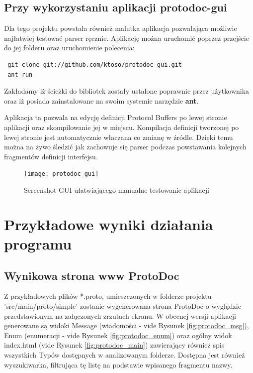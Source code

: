 \documentclass[a4paper]{article}
\begin{document}
\subsection{Przy wykorzystaniu aplikacji protodoc-gui}
Dla tego projektu powstała również malutka aplikacja pozwalająca możliwie najłatwiej testować parser ręcznie.
Aplikację można uruchomić poprzez przejście do jej folderu oraz uruchomienie polecenia: 
\begin{verbatim}
 git clone git://github.com/ktoso/protodoc-gui.git
 ant run
\end{verbatim}
Zakładamy iż ścieżki do bibliotek zostały ustalone poprawnie przez użytkownika oraz iż posiada zainstalowane na swoim systemie narzędzie \textbf{ant}.

Aplikacja ta pozwala na edycję definicji Protocol Buffers po lewej stronie aplikacji oraz skompilowanie jej w miejscu. Kompilacja definicji tworzonej po lewej 
stronie jest automatycznie właczana co zmianę w źródle. Dzięki temu można na żywo śledzić jak zachowuje się parser podczas powstawania kolejnych fragmentów definicji interfejsu.

\newpage
\begin{figure}[ch!]
 \centering
 \texttt{[image: protodoc\_gui]}
 \caption{Screenshot GUI ułatwiającego manualne testowanie aplikacji}
 \label{fig:gui}
\end{figure}



\newpage
\section{Przykładowe wyniki działania programu}
\subsection{Wynikowa strona www ProtoDoc}
Z przykładowych plików *.proto, umieszczonych w folderze projektu 'src/main/proto/simple' 
zostanie wygenerowana strona ProtoDoc o wyglądzie przedstawionym na załączonych zrzutach ekranu.
W obecnej wersji aplikacji generowane są widoki Message (wiadomości - vide Rysunek \ref{fig:protodoc_msg}), Enum (enumeracji - vide Rysunek \ref{fig:protodoc_enum}) 
oraz ogólny widok index.html (vide Rysunek \ref{fig:protodoc_main}) zawierający również spis wszystkich Typów dostępnych w analizowanym folderze. Dostępna jest również wyszukiwarka, filtrująca tę listę na podstawie 
wpisanego fragmentu nazwy.
\end{document}
